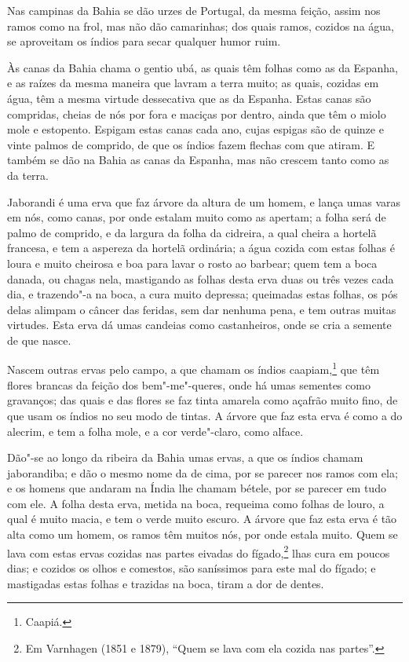 \begin{linenumbers}
Nas campinas da Bahia se dão urzes de Portugal, da mesma feição, assim nos ramos como na
frol, mas não dão camarinhas; dos quais ramos, cozidos na água, se aproveitam os índios
para secar qualquer humor ruim.

Às canas da Bahia chama o gentio ubá, as quais têm folhas como as da Espanha, e as raízes
da mesma maneira que lavram a terra muito; as quais, cozidas em água, têm a mesma virtude
dessecativa que as da Espanha. Estas canas são compridas, cheias de nós por fora e maciças
por dentro, ainda que têm o miolo mole e estopento. Espigam estas canas cada ano, cujas
espigas são de quinze e vinte palmos de comprido, de que os índios fazem flechas com que
atiram. E também se dão na Bahia as canas da Espanha, mas não crescem tanto como as da
terra.

Jaborandi é uma erva que faz árvore da altura de um homem, e lança umas varas em nós, como
canas, por onde estalam muito como as apertam; a folha será de palmo de comprido, e da
largura da folha da cidreira, a qual cheira a hortelã francesa, e tem a aspereza da
hortelã ordinária; a água cozida com estas folhas é loura e muito cheirosa e boa para
lavar o rosto ao barbear; quem tem a boca danada, ou chagas nela, mastigando as folhas
desta erva duas ou três vezes cada dia, e trazendo"-a na boca, a cura muito depressa;
queimadas estas folhas, os pós delas alimpam o câncer das feridas, sem dar nenhuma pena, e
tem outras muitas virtudes. Esta erva dá umas candeias como castanheiros, onde se cria a
semente de que nasce.

Nascem outras ervas pelo campo, a que chamam os índios caapiam,\footnote{ Caapiá.} que têm
flores brancas da feição dos bem"-me"-queres, onde há umas sementes como gravanços; das
quais e das flores se faz tinta amarela como açafrão muito fino, de que usam os índios no
seu modo de tintas. A árvore que faz esta erva é como a do alecrim, e tem a folha mole, e
a cor verde"-claro, como alface.

Dão"-se ao longo da ribeira da Bahia umas ervas, a que os índios chamam jaborandiba; e dão
o mesmo nome da de cima, por se parecer nos ramos com ela; e os homens que andaram na
Índia lhe chamam bétele, por se parecer em tudo com ele. A folha desta erva, metida na
boca, requeima como folhas de louro, a qual é muito macia, e tem o verde muito escuro. A
árvore que faz esta erva é tão alta como um homem, os ramos têm muitos nós, por onde
estala muito. Quem se lava com estas ervas cozidas nas partes eivadas do fígado,\footnote{
Em Varnhagen (1851 e 1879), ``Quem se lava com ela cozida nas partes''.} lhas cura em
poucos dias; e cozidos os olhos e comestos, são saníssimos para este mal do fígado; e
mastigadas estas folhas e trazidas na boca, tiram a dor de dentes.


\end{linenumbers}
